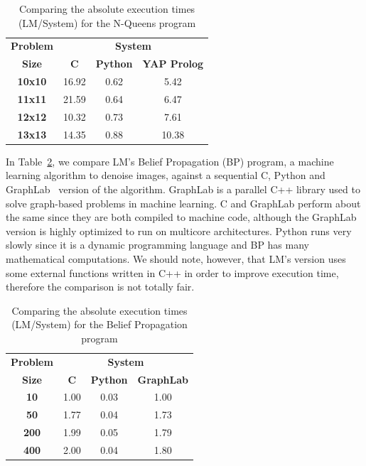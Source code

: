 \documentclass{sigplanconf}
\begin{document}
\begin{table}[ht]
\centering
{\begin{tabular}{c|c|c|c}
\textbf{Problem} & \multicolumn{3}{c}{\textbf{System}} \\
\textbf{Size} & \textbf{C} & \textbf{Python} & \textbf{YAP Prolog} \\
\hline\hline
\textbf{10x10} & 16.92 & 0.62 & 5.42 \\
\textbf{11x11} & 21.59 & 0.64 & 6.47 \\
\textbf{12x12} & 10.32 & 0.73 & 7.61 \\
\textbf{13x13} & 14.35 & 0.88 & 10.38 \\
\end{tabular}}
\caption{Comparing the absolute execution times (LM/System) for the
  N-Queens program}
\label{tbl:comp_nqueens}
\end{table}

In Table~\ref{tbl:comp_bp}, we compare LM's Belief Propagation (BP)
program, a machine learning algorithm to denoise images, against a
sequential C, Python and GraphLab~\cite{GraphLab2010} version of the
algorithm. GraphLab is a parallel C++ library used to solve
graph-based problems in machine learning. C and GraphLab perform about
the same since they are both compiled to machine code, although
the GraphLab version is highly optimized to run on multicore architectures.
Python runs very slowly since it is a
dynamic programming language and BP has many mathematical
computations. We should note, however, that LM's version uses some
external functions written in C++ in order to improve execution time,
therefore the comparison is not totally fair.

\begin{table}[ht]
\centering
{\begin{tabular}{c|c|c|c}
\textbf{Problem} & \multicolumn{3}{c}{\textbf{System}} \\
\textbf{Size} & \textbf{C} & \textbf{Python} & \textbf{GraphLab} \\
\hline\hline
\textbf{10}  & 1.00 & 0.03 & 1.00 \\
\textbf{50}  & 1.77 & 0.04 & 1.73 \\
\textbf{200} & 1.99 & 0.05 & 1.79 \\
\textbf{400} & 2.00 & 0.04 & 1.80 \\
\end{tabular}}
\caption{Comparing the absolute execution times (LM/System) for the
  Belief Propagation program}
\label{tbl:comp_bp}
\end{table}
\end{document}
